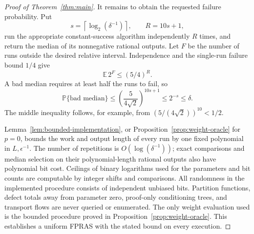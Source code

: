 \begin{proof}[Proof of Theorem~\ref{thm:main}]
It remains to obtain the requested failure probability.  Put
\[
 s=\left\lceil\log_2(\delta^{-1})\right\rceil,\qquad
 R=10s+1,
\]
run the appropriate constant-success algorithm independently
\(R\) times, and return the median of its nonnegative rational
outputs.  Let \(F\) be the number of runs outside the desired
relative interval.  Independence and the single-run failure
bound \(1/4\) give
\[
 \mathbb E\,2^F\leq(5/4)^R.
\]
A bad median requires at least half the runs to fail, so
\[
 \mathbb P\{\text{bad median}\}
 \leq \left(\frac{5}{4\sqrt2}\right)^{10s+1}
 \leq 2^{-s}\leq\delta.
\]
The middle inequality follows, for example, from
\((5/(4\sqrt2))^{10}<1/2\).

Lemma~\ref{lem:bounded-implementation}, or
Proposition~\ref{prop:weight-oracle} for \(p=0\), bounds the work
and output length of every run by one fixed polynomial in
\(L,\epsilon^{-1}\).  The number of repetitions is
\(O(\log(\delta^{-1}))\); exact comparisons and median selection
on their polynomial-length rational outputs also have polynomial
bit cost.  Ceilings of binary logarithms used for the parameters
and bit counts are computable by integer shifts and comparisons.
All randomness in the implemented procedure consists of
independent unbiased bits.  Partition functions, defect totals
away from parameter zero, proof-only conditioning trees, and
transport flows are never queried or enumerated.  The only weight
evaluation used is the bounded procedure proved in
Proposition~\ref{prop:weight-oracle}.  This establishes a uniform
FPRAS with the stated bound on every execution.
\end{proof}
